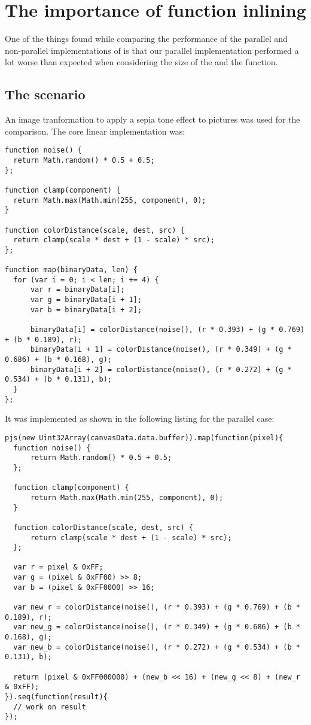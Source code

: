 \section{The importance of function inlining}
One of the things found while comparing the performance of the parallel and non-parallel implementations of  is that our parallel implementation performed a lot worse than expected when considering the size of the \ttarray{} and the  function.

\subsection{The scenario}
An image tranformation to apply a sepia tone effect to pictures was used for the comparison. The core linear implementation was:
\begin{lstlisting}[caption=Sepia tone linear implementation]
function noise() {
  return Math.random() * 0.5 + 0.5;
};

function clamp(component) {
  return Math.max(Math.min(255, component), 0);
}

function colorDistance(scale, dest, src) {
  return clamp(scale * dest + (1 - scale) * src);
};

function map(binaryData, len) {
  for (var i = 0; i < len; i += 4) {
      var r = binaryData[i];
      var g = binaryData[i + 1];
      var b = binaryData[i + 2];

      binaryData[i] = colorDistance(noise(), (r * 0.393) + (g * 0.769) + (b * 0.189), r);
      binaryData[i + 1] = colorDistance(noise(), (r * 0.349) + (g * 0.686) + (b * 0.168), g);
      binaryData[i + 2] = colorDistance(noise(), (r * 0.272) + (g * 0.534) + (b * 0.131), b);
  }
};
\end{lstlisting}


It was implemented as shown in the following listing for the parallel case:
\begin{lstlisting}[caption=Sepia tone initial parallel implementation]
pjs(new Uint32Array(canvasData.data.buffer)).map(function(pixel){
  function noise() {
      return Math.random() * 0.5 + 0.5;
  };

  function clamp(component) {
      return Math.max(Math.min(255, component), 0);
  }

  function colorDistance(scale, dest, src) {
      return clamp(scale * dest + (1 - scale) * src);
  };

  var r = pixel & 0xFF;
  var g = (pixel & 0xFF00) >> 8;
  var b = (pixel & 0xFF0000) >> 16;

  var new_r = colorDistance(noise(), (r * 0.393) + (g * 0.769) + (b * 0.189), r);
  var new_g = colorDistance(noise(), (r * 0.349) + (g * 0.686) + (b * 0.168), g);
  var new_b = colorDistance(noise(), (r * 0.272) + (g * 0.534) + (b * 0.131), b);

  return (pixel & 0xFF000000) + (new_b << 16) + (new_g << 8) + (new_r & 0xFF);
}).seq(function(result){
  // work on result
});
\end{lstlisting}

